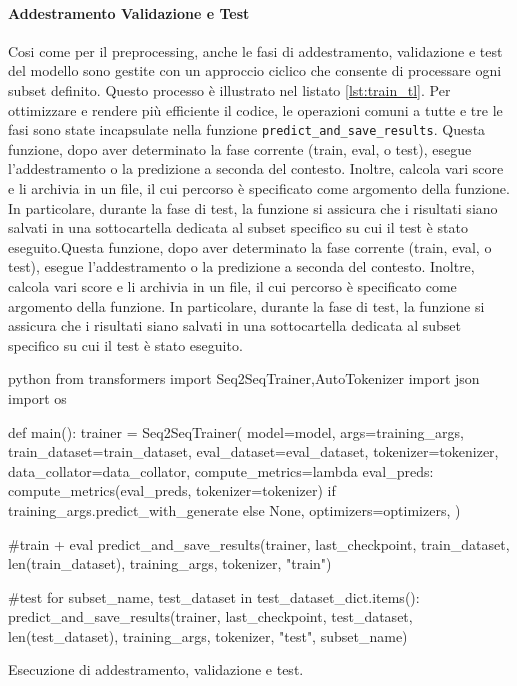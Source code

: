 \documentclass[12pt,a4paper,twoside,openright]{book}
\begin{document}
\paragraph{Addestramento Validazione e Test}
Cosi come per il preprocessing, anche le fasi di addestramento, validazione e test del modello sono gestite con un approccio ciclico che consente di processare ogni subset definito. Questo processo è illustrato nel listato \ref{lst:train_tl}. Per ottimizzare e rendere più efficiente il codice, le operazioni comuni a tutte e tre le fasi sono state incapsulate nella funzione \texttt{predict\_and\_save\_results}. Questa funzione, dopo aver determinato la fase corrente (train, eval, o test), esegue l'addestramento o la predizione a seconda del contesto. Inoltre, calcola vari score e li archivia in un file, il cui percorso è specificato come argomento della funzione. In particolare, durante la fase di test, la funzione si assicura che i risultati siano salvati in una sottocartella dedicata al subset specifico su cui il test è stato eseguito.Questa funzione, dopo aver determinato la fase corrente (train, eval, o test), esegue l'addestramento o la predizione a seconda del contesto. Inoltre, calcola vari score e li archivia in un file, il cui percorso è specificato come argomento della funzione. In particolare, durante la fase di test, la funzione si assicura che i risultati siano salvati in una sottocartella dedicata al subset specifico su cui il test è stato eseguito.

\begin{customcode}
\begin{mintedbox}{python}
from transformers import Seq2SeqTrainer,AutoTokenizer
import json
import os

def main():
    trainer = Seq2SeqTrainer(
        model=model,
        args=training_args,
        train_dataset=train_dataset,
        eval_dataset=eval_dataset,
        tokenizer=tokenizer,
        data_collator=data_collator,
        compute_metrics=lambda eval_preds: compute_metrics(eval_preds, tokenizer=tokenizer) if training_args.predict_with_generate else None,
        optimizers=optimizers,
    )

    #train + eval
    predict_and_save_results(trainer, last_checkpoint, train_dataset, len(train_dataset), training_args, tokenizer, "train")

    #test 
    for subset_name, test_dataset in test_dataset_dict.items():
        predict_and_save_results(trainer, last_checkpoint, test_dataset, len(test_dataset), training_args, tokenizer, "test", subset_name)
\end{mintedbox}
\caption{Esecuzione di addestramento, validazione e test.}
\label{lst:train_tl}
\end{customcode}
\end{document}
